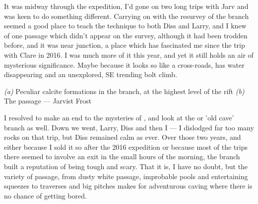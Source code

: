 	It was midway through the expedition, I'd gone on two long trips with Jarv and was keen to do something different. Carrying on with the resurvey of the  branch seemed a good place to teach the technique to both Diss and Larry, and I knew of one passage which didn't appear on the survey, although it had been trodden before, and it was near  junction, a place which has fascinated me since the trip with Clare in 2016. I was much more of it this year, and yet it still holds an air of mysterious significance. Maybe because it looks so like a cross-roads, has water disappearing and an unexplored, SE trending bolt climb. 
	

	\begin{pagefigure}
	\checkoddpage \ifoddpage \forcerectofloat \else \forceversofloat \fi
	\centering
	\begin{subfigure}[t]{0.7031\textwidth}
		\centering
		 \caption{}\label{formations povezava}
	\end{subfigure}
  	 \hfill
   	 \begin{subfigure}[t]{0.2869\textwidth}
        		\centering
        		\caption{} \label{povezava passage}
        \end{subfigure}
	\caption{
	 	  \textit{(a)} Peculiar calcite formations in the \protect{} branch, at the highest level of the rift
   		 \textit{(b)} The \protect{} passage --- Jarvist Frost}
\end{pagefigure}

	I resolved to make an end to the mysteries of , and look at the  or 'old cave' branch as well. Down we went, Larry, Diss and then I --- I dislodged far too many rocks on that trip, but Diss remained calm as ever. Over those two years, and either because I sold it so after the 2016 expedition or because most of the trips there seemed to involve an  exit in the small hours of the morning, the  branch built a reputation of being tough and scary.  That it is, I have no doubt, but the variety of passage, from dusty white  passage, improbable pools and entertaining squeezes to traverses and big pitches makes for adventurous caving where there is no chance of getting bored. 
    	
